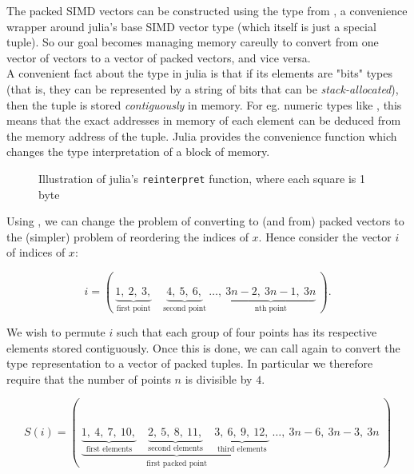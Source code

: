 The packed SIMD vectors can be constructed using the  type from  
\cite*{simd.jl}, a convenience wrapper around julia's base SIMD vector type (which itself 
is just a special tuple). So our goal becomes managing memory careully to  
convert from one vector of vectors to a vector of packed vectors, and vice versa. \\

A convenient fact about the  type in julia is that if its elements are 
"bits" types (that is, they can be represented by a string of bits that can be \emph{stack-allocated}), 
then the tuple is stored \emph{contiguously} in memory. For eg. numeric types like 
, this means that the exact addresses in memory of each element can be 
deduced from the memory address of the tuple. Julia provides the convenience function 
 which changes the type interpretation of a block of memory. \\

\begin{figure}[ht]
    \caption{Illustration of julia's \texttt{reinterpret} function, where each square is 1 byte}
    \label{fig:reinterpret}
\end{figure}

Using , we can change the problem of converting to (and from) packed vectors
to the (simpler) problem of reordering the indices of $x$. 
Hence consider the vector $i$ of indices of $x$: 

\begin{equation}
    i = (\ 
        \underbrace{1,\ 2,\ 3,}_{\text{first point}}\quad 
        \underbrace{4,\ 5,\ 6,}_{\text{second point}}\ 
        \ldots,\ 
        \underbrace{3n-2,\ 3n-1,\ 3n}_{\text{nth point}}
    \ ).
\end{equation}

We wish to permute $i$ such that each group of four points has its respective elements 
stored contiguously. Once this is done, we can call  again to convert 
the type representation to a vector of packed tuples. In particular we therefore require 
that the number of points $n$ is divisible by $4$. 

\begin{equation}
    S(i) = (\ \underbrace{
        \underbrace{1,\ 4,\ 7,\ 10,}_{\text{first elements}}\quad 
        \underbrace{2,\ 5,\ 8,\ 11,}_{\text{second elements}}\quad
        \underbrace{3,\ 6,\ 9,\ 12,}_{\text{third elements}}\  
    }_{
        \text{first packed point}
    }
        \ldots,\ 
        3n-6,\ 3n-3,\ 3n
    \ )
\end{equation}

